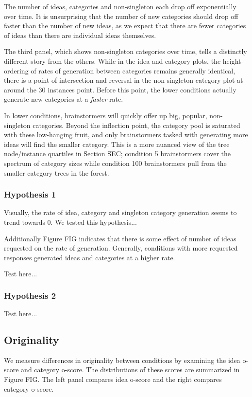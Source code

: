 The number of ideas, categories and non-singleton each drop off exponentially over time. It is unsurprising that the number of new categories should drop off faster than the number of new ideas, as we expect that there are fewer categories of ideas than there are individual ideas themselves.

The third panel, which shows non-singleton categories over time, tells a distinctly different story from the others. While in the idea and category plots, the height-ordering of rates of generation between categories remains generally identical, there is a point of intersection and reversal in the non-singleton category plot at around the 30 instances point. Before this point, the lower conditions actually generate new categories at a \emph{faster} rate.

In lower conditions, brainstormers will quickly offer up big, popular, non-singleton categories. Beyond the inflection point, the category pool is saturated with these low-hanging fruit, and only brainstormers tasked with generating more ideas will find the smaller category. This is a more nuanced view of the tree node/instance quartiles in Section SEC; condition 5 brainstormers cover the spectrum of category sizes while condition 100 brainstormers pull from the smaller category trees in the forest.

\subsubsection{Hypothesis 1}

Visually, the rate of idea, category and singleton category generation seems to trend towards 0. We tested this hypothesis...

Additionally Figure FIG indicates that there is some effect of number of ideas requested on the rate of generation. Generally, conditions with more requested responses generated ideas and categories at a higher rate.

Test here...

\subsubsection{Hypothesis 2}

Test here...

\subsection{Originality}

We measure differences in originality between conditions by examining the idea o-score and category o-score. The distributions of these scores are summarized in Figure FIG. The left panel compares idea o-score and the right compares category o-score.

